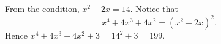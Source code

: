 From the condition, $x^2+2x=14$. Notice that
\[
x^4+4x^3+4x^2=(x^2+2x)^2 .
\]
Hence $x^4+4x^3+4x^2+3=14^2+3=\boxed{199}$.

